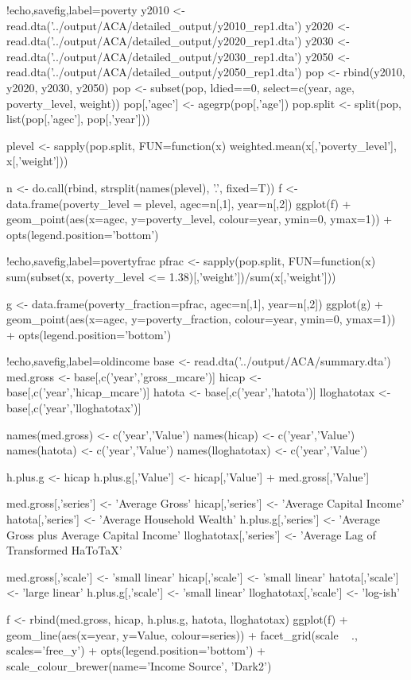 \documentclass{article}
\begin{document}
\begin{Rcode}{!echo,savefig,label=poverty}
y2010 <- read.dta('../output/ACA/detailed_output/y2010_rep1.dta')
y2020 <- read.dta('../output/ACA/detailed_output/y2020_rep1.dta')
y2030 <- read.dta('../output/ACA/detailed_output/y2030_rep1.dta')
y2050 <- read.dta('../output/ACA/detailed_output/y2050_rep1.dta')
pop <- rbind(y2010, y2020, y2030, y2050)
pop <- subset(pop, ldied==0, select=c(year, age, poverty_level, weight))
pop[,'agec'] <- agegrp(pop[,'age'])
pop.split <- split(pop, list(pop[,'agec'], pop[,'year']))

plevel <- sapply(pop.split, FUN=function(x)
weighted.mean(x[,'poverty_level'], x[,'weight']))

n <- do.call(rbind, strsplit(names(plevel), '.', fixed=T))
f <- data.frame(poverty_level = plevel, agec=n[,1], year=n[,2])
ggplot(f) + 
geom_point(aes(x=agec, y=poverty_level, colour=year, ymin=0, ymax=1)) + 
opts(legend.position='bottom')
\end{Rcode}

\begin{Rcode}{!echo,savefig,label=povertyfrac}
pfrac <- sapply(pop.split, FUN=function(x) sum(subset(x, poverty_level
<= 1.38)[,'weight'])/sum(x[,'weight']))

g <- data.frame(poverty_fraction=pfrac, agec=n[,1], year=n[,2])
ggplot(g) + 
geom_point(aes(x=agec, y=poverty_fraction, colour=year, ymin=0, ymax=1)) + 
opts(legend.position='bottom')
\end{Rcode}

\begin{Rcode}{!echo,savefig,label=oldincome}
base <-  read.dta('../output/ACA/summary.dta')
med.gross <- base[,c('year','gross_mcare')]
hicap <- base[,c('year','hicap_mcare')]
hatota <- base[,c('year','hatota')]
lloghatotax <- base[,c('year','lloghatotax')]

names(med.gross) <- c('year','Value')
names(hicap) <- c('year','Value')
names(hatota) <- c('year','Value')
names(lloghatotax) <- c('year','Value')

h.plus.g <- hicap
h.plus.g[,'Value'] <- hicap[,'Value'] + med.gross[,'Value']

med.gross[,'series'] <- 'Average Gross'
hicap[,'series'] <- 'Average Capital Income'
hatota[,'series'] <- 'Average Household Wealth'
h.plus.g[,'series'] <- 'Average Gross plus Average Capital Income'
lloghatotax[,'series'] <- 'Average Lag of Transformed HaToTaX'

med.gross[,'scale'] <- 'small linear'
hicap[,'scale'] <- 'small linear'
hatota[,'scale'] <- 'large linear'
h.plus.g[,'scale'] <- 'small linear'
lloghatotax[,'scale'] <- 'log-ish'

f <- rbind(med.gross, hicap, h.plus.g, hatota, lloghatotax)
ggplot(f) + geom_line(aes(x=year, y=Value, colour=series)) +
facet_grid(scale ~ ., scales='free_y') +
opts(legend.position='bottom') + scale_colour_brewer(name='Income Source', 'Dark2')
\end{Rcode}
\end{document}

